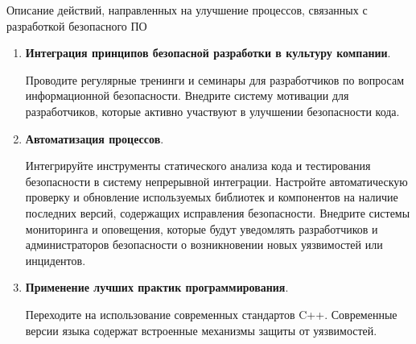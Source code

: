 \documentclass[10pt]{beamer}
\begin{document}
\begin{frame}{Описание действий, направленных на улучшение процессов, связанных с разработкой безопасного ПО}
    \begin{enumerate}
        \item \textbf{Интеграция принципов безопасной разработки в культуру компании}.

        Проводите регулярные тренинги и семинары для разработчиков по вопросам информационной безопасности. Внедрите систему мотивации для разработчиков, которые активно участвуют в улучшении безопасности кода.

        \item \textbf{Автоматизация процессов}.

        Интегрируйте инструменты статического анализа кода и тестирования безопасности в систему непрерывной интеграции.
        Настройте автоматическую проверку и обновление используемых библиотек и компонентов на наличие последних версий, содержащих исправления безопасности. Внедрите системы мониторинга и оповещения, которые будут уведомлять разработчиков и администраторов безопасности о возникновении новых уязвимостей или инцидентов.

        \item \textbf{Применение лучших практик программирования}.

        Переходите на использование современных стандартов C++. Современные версии языка содержат встроенные механизмы защиты от уязвимостей.

    \end{enumerate}
\end{frame}
\end{document}
